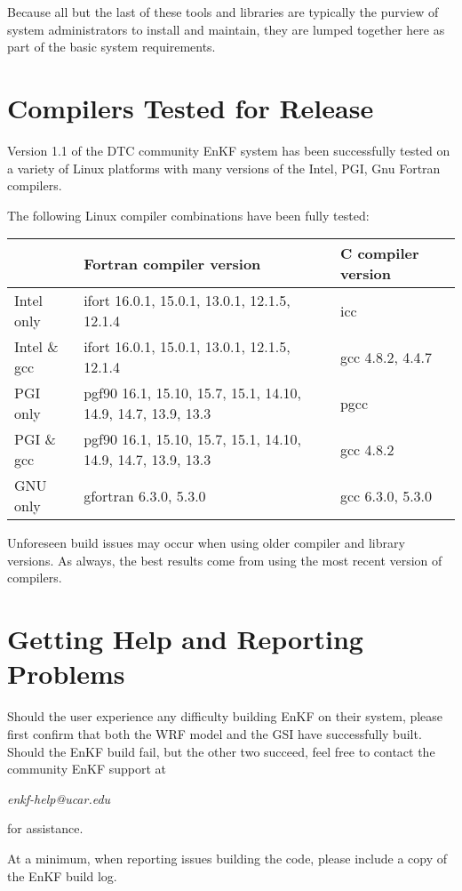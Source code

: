 Because all but the last of these tools and libraries are typically the purview of system administrators to install and maintain, they are lumped together here as part of the basic system requirements.

\section{Compilers Tested for Release}  \label{ch2_compilers_tested}

Version 1.1 of the DTC community EnKF system has been successfully tested on a variety of Linux platforms with many versions of the Intel, PGI, Gnu Fortran compilers.

The following Linux compiler combinations have been fully tested:
\begin{table}[htbp]
\centering
\begin{tabular}{| l | l | l |}
\hline
  & Fortran compiler version   &   C compiler version    \\
\hline
\hline
Intel only  &  ifort    16.0.1, 15.0.1, 13.0.1, 12.1.5, 12.1.4       & icc \\
\hline
Intel \& gcc  &  ifort    16.0.1, 15.0.1, 13.0.1, 12.1.5, 12.1.4       &  gcc 4.8.2, 4.4.7  \\
\hline
PGI only  &   pgf90   16.1, 15.10, 15.7, 15.1, 14.10, 14.9, 14.7, 13.9, 13.3    &  pgcc  \\
\hline
PGI \& gcc  &   pgf90   16.1, 15.10, 15.7, 15.1, 14.10, 14.9, 14.7, 13.9, 13.3    &    gcc 4.8.2 \\
\hline
GNU only &  gfortran  6.3.0, 5.3.0   & gcc 6.3.0, 5.3.0 \\
\hline
\end{tabular}
\label{ch2_tble1}
\end{table} 

Unforeseen build issues may occur when using older compiler and library versions. As always, the best results come from using the most recent version of compilers.

\section{Getting Help and Reporting Problems} \label{ch2_getting_help}

Should the user experience any difficulty building EnKF on their system, please first confirm that both the WRF model and the GSI have successfully built. Should the EnKF build fail, but the other two succeed, feel free to contact the community EnKF support at 
\begin{center}
\textit{enkf-help@ucar.edu}
\end{center}
 for assistance.

At a minimum, when reporting issues building the code, please include a copy of the EnKF build log.
